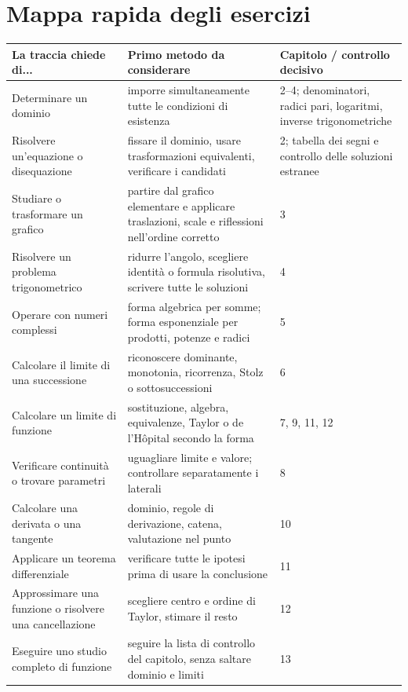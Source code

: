\chapter*{Mappa rapida degli esercizi}

\begin{longtable}{@{}p{}p{}p{}@{}}
\toprule
\textbf{La traccia chiede di...} & \textbf{Primo metodo da considerare} & \textbf{Capitolo / controllo decisivo}\\
\midrule
\endhead
Determinare un dominio & imporre simultaneamente tutte le condizioni di esistenza & 2--4; denominatori, radici pari, logaritmi, inverse trigonometriche\\
Risolvere un'equazione o disequazione & fissare il dominio, usare trasformazioni equivalenti, verificare i candidati & 2; tabella dei segni e controllo delle soluzioni estranee\\
Studiare o trasformare un grafico & partire dal grafico elementare e applicare traslazioni, scale e riflessioni nell'ordine corretto & 3\\
Risolvere un problema trigonometrico & ridurre l'angolo, scegliere identità o formula risolutiva, scrivere tutte le soluzioni & 4\\
Operare con numeri complessi & forma algebrica per somme; forma esponenziale per prodotti, potenze e radici & 5\\
Calcolare il limite di una successione & riconoscere dominante, monotonia, ricorrenza, Stolz o sottosuccessioni & 6\\
Calcolare un limite di funzione & sostituzione, algebra, equivalenze, Taylor o de l'Hôpital secondo la forma & 7, 9, 11, 12\\
Verificare continuità o trovare parametri & uguagliare limite e valore; controllare separatamente i laterali & 8\\
Calcolare una derivata o una tangente & dominio, regole di derivazione, catena, valutazione nel punto & 10\\
Applicare un teorema differenziale & verificare tutte le ipotesi prima di usare la conclusione & 11\\
Approssimare una funzione o risolvere una cancellazione & scegliere centro e ordine di Taylor, stimare il resto & 12\\
Eseguire uno studio completo di funzione & seguire la lista di controllo del capitolo, senza saltare dominio e limiti & 13\\

\end{longtable}
